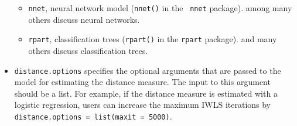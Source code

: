 \begin{itemize}
\begin{itemize}
  \item \texttt{nnet}, neural network model ({\tt nnet()} in the {\tt
      nnet} package).
    \citet{BecKinZen00,Bishop95,KinZen02,White92,Zeng99} among many
    others discuss neural networks.
  
  \item \texttt{rpart}, classification trees ({\tt rpart()} in the
    \texttt{rpart} package). \citet{BreFriOls84,RugKimMar03} and many
    others discuss classification trees.
  \end{itemize}
  
\item \texttt{distance.options} specifies the optional arguments that
  are passed to the model for estimating the distance measure. The
  input to this argument should be a list.  For example, if the
  distance measure is estimated with a logistic regression, users can
  increase the maximum IWLS iterations by \texttt{distance.options =
    list(maxit = 5000)}.
  

\end{itemize}
